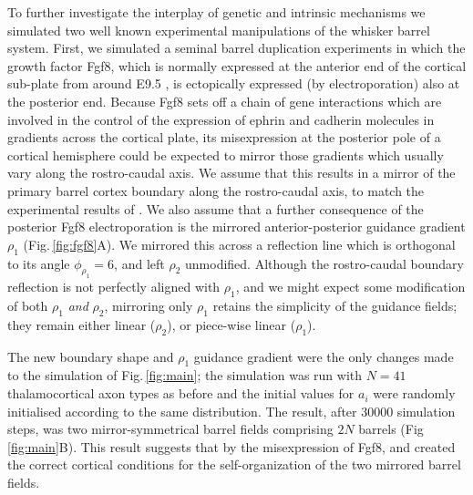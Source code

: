 \documentclass[9pt,lineno]{elife}
\newcommand{\MPthreePred}[1]{\textcolor{revorange}{#1}}
\begin{document}
\MPthreePred{To further investigate the interplay of genetic and intrinsic
  mechanisms we simulated two well known experimental manipulations of the
  whisker barrel system. First, we simulated a seminal barrel duplication
  experiments}
\citep{shimogori_fibroblast_2005,assimacopoulos_fibroblast_2012}
\MPthreePred{in which the growth factor Fgf8, which is normally expressed at
  the anterior end of the cortical sub-plate from around E9.5}
\citep{crossley_mouse_1995}, \MPthreePred{is ectopically expressed (by
  electroporation) also at the posterior end. Because Fgf8 sets off a chain of
  gene interactions which are involved in the control of the expression of
  ephrin and cadherin molecules in gradients across the cortical plate, its
  misexpression at the posterior pole of a cortical hemisphere could be
  expected to mirror those gradients which usually vary along the
  rostro-caudal axis. We assume that this results in a mirror of the primary
  barrel cortex boundary along the rostro-caudal axis, to match the
  experimental results of}
\citealp{assimacopoulos_fibroblast_2012}. \MPthreePred{We also assume that a
  further consequence of the posterior Fgf8 electroporation is the mirrored
  anterior-posterior guidance gradient $\rho_1$ (Fig.\,\ref{fig:fgf8}A). We
  mirrored this across a reflection line which is orthogonal to its angle
  $\phi_{\rho_1}=6$\textdegree, and left $\rho_2$ unmodified. Although the
  rostro-caudal boundary reflection is not perfectly aligned with $\rho_1$,
  and we might expect some modification of both $\rho_1$ \emph{and} $\rho_2$,
  mirroring only $\rho_1$ retains the simplicity of the guidance fields; they
  remain either linear ($\rho_2$), or piece-wise linear ($\rho_1$).}

\MPthreePred{The new boundary shape and $\rho_1$ guidance gradient were the
  only changes made to the simulation of Fig.\,\ref{fig:main}; the simulation
  was run with $N=41$ thalamocortical axon types as before and the initial
  values for $a_i$ were randomly initialised according to the same
  distribution. The result, after 30000 simulation steps, was two
  mirror-symmetrical barrel fields comprising $2N$ barrels
  (Fig\,\ref{fig:main}B). This result suggests that by the misexpression of
  Fgf8,} \cite{shimogori_fibroblast_2005} and \cite{assimacopoulos_fibroblast_2012}
  \MPthreePred{created the correct cortical
  conditions for the self-organization of the two mirrored barrel fields. }

\end{document}
